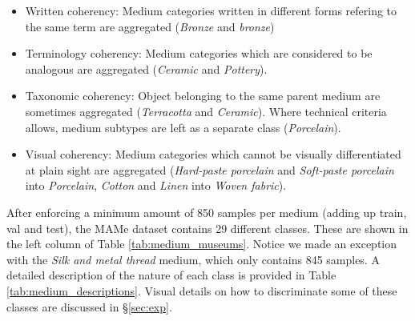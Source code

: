 \documentclass{article}
\begin{document}
\begin{itemize}
    \item Written coherency: Medium categories written in different forms refering to the same term are aggregated (\eg \textit{Bronze} and \textit{bronze})
    \item Terminology coherency: Medium categories which are considered to be analogous are aggregated (\eg \textit{Ceramic} and \textit{Pottery}).
    \item Taxonomic coherency: Object belonging to the same parent medium are sometimes aggregated (\eg \textit{Terracotta} and \textit{Ceramic}). Where technical criteria allows, medium subtypes are left as a separate class (\eg \textit{Porcelain}).
    \item Visual coherency: Medium categories which cannot be visually differentiated at plain sight are aggregated (\eg \textit{Hard-paste porcelain} and \textit{Soft-paste porcelain} into \textit{Porcelain}, \textit{Cotton} and \textit{Linen} into \textit{Woven fabric}).
\end{itemize} 

After enforcing a minimum amount of 850 samples per medium (adding up train, val and test), the MAMe dataset contains 29 different classes. These are shown in the left column of Table \ref{tab:medium_museums}. Notice we made an exception with the \textit{Silk and metal thread} medium, which only contains 845 samples. A detailed description of the nature of each class is provided in Table \ref{tab:medium_descriptions}. Visual details on how to discriminate some of these classes are discussed in \S\ref{sec:exp}.
\end{document}
